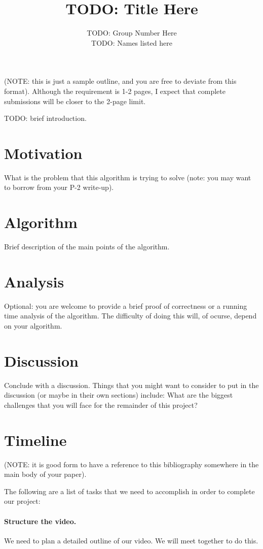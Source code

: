 \documentclass[11pt,twocolumn]{article}
\title{TODO: Title Here}
\author{TODO: Group Number Here \\ 
\small{TODO: Names listed here}}
\begin{document}
\maketitle

(NOTE: this is just a sample outline, and you are free to deviate from this 
format).  Although the requirement is 1-2 pages, I expect that complete 
submissions will be closer to the 2-page limit.

TODO: brief introduction.

\section{Motivation}
What is the problem that this algorithm is trying to solve (note: you may want 
to borrow from your P-2 write-up).

\section{Algorithm}
Brief description of the main points of the algorithm.

\section{Analysis}
Optional: you are welcome to provide a brief proof of correctness or a 
running time analysis of the algorithm.  The difficulty of doing this will, of 
ocurse, depend on your algorithm.

\section{Discussion}
Conclude with a discussion.  Things that you might want to consider to put in 
the discussion (or maybe in their own sections) include: What are the biggest 
challenges that you will face for the remainder of this project?  


 

\newpage
\appendix
\section{Timeline}
(NOTE: it is good form to have a reference to this bibliography somewhere in 
the main body of your paper).

The following are a list of tasks that we need to accomplish in order to 
complete our project:

\paragraph{Structure the video.} We need to plan a detailed outline of our 
video.  We will meet together to do this.
\end{document}
